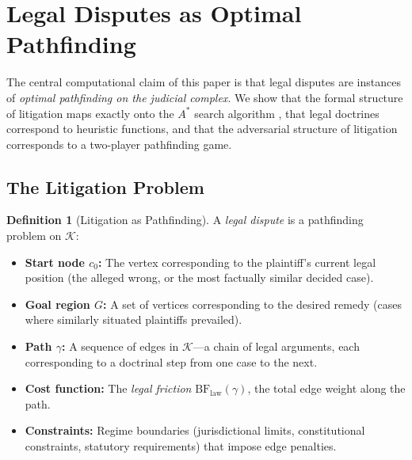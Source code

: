\documentclass[12pt]{article}
\theoremstyle{definition}
\newtheorem{definition}[theorem]{Definition}
\theoremstyle{remark}
\newcommand{\BF}{\mathrm{BF}}
\begin{document}
\section{Legal Disputes as Optimal Pathfinding}
\label{sec:pathfinding}

The central computational claim of this paper is that legal disputes are instances of \emph{optimal pathfinding on the judicial complex}.  We show that the formal structure of litigation maps exactly onto the $A^*$ search algorithm \cite{hart1968}, that legal doctrines correspond to heuristic functions, and that the adversarial structure of litigation corresponds to a two-player pathfinding game.

\subsection{The Litigation Problem}

\begin{definition}[Litigation as Pathfinding]
A \emph{legal dispute} is a pathfinding problem on $\mathcal{K}$:
\begin{itemize}
    \item \textbf{Start node $c_0$:} The vertex corresponding to the plaintiff's current legal position (the alleged wrong, or the most factually similar decided case).
    \item \textbf{Goal region $G$:} A set of vertices corresponding to the desired remedy (cases where similarly situated plaintiffs prevailed).
    \item \textbf{Path $\gamma$:} A sequence of edges in $\mathcal{K}$---a chain of legal arguments, each corresponding to a doctrinal step from one case to the next.
    \item \textbf{Cost function:} The \emph{legal friction} $\BF_{\text{law}}(\gamma)$, the total edge weight along the path.
    \item \textbf{Constraints:} Regime boundaries (jurisdictional limits, constitutional constraints, statutory requirements) that impose edge penalties.
\end{itemize}
\end{definition}
\end{document}
